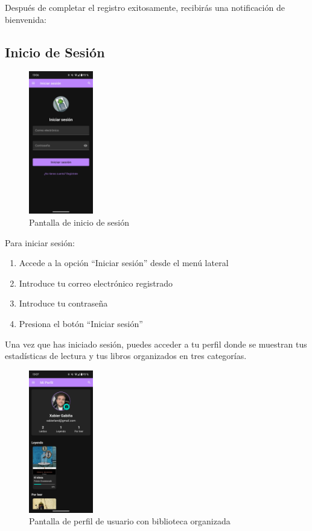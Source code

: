 \documentclass[a4paper,10pt]{report}
\begin{document}
      Después de completar el registro exitosamente, recibirás una notificación de bienvenida:
    
    \subsection{Inicio de Sesión}
    
    \begin{figure}[H]
      \centering
      \includegraphics[width=0.25\textwidth]{.img/login.png}
      \caption{Pantalla de inicio de sesión}
      \label{fig:login}
    \end{figure}
    
    Para iniciar sesión:
    \begin{enumerate}
      \item Accede a la opción ``Iniciar sesión'' desde el menú lateral
      \item Introduce tu correo electrónico registrado
      \item Introduce tu contraseña
      \item Presiona el botón ``Iniciar sesión''
    \end{enumerate}    
    
    Una vez que has iniciado sesión, puedes acceder a tu perfil donde se muestran tus estadísticas de lectura y tus libros organizados en tres categorías.
    
    \begin{figure}[H]
      \centering
      \includegraphics[width=0.25\textwidth]{.img/profile.png}
      \caption{Pantalla de perfil de usuario con biblioteca organizada}
      \label{fig:perfil}
    \end{figure}
    
\end{document}
